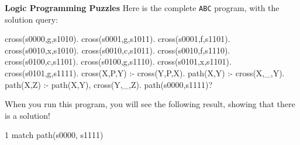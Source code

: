 \begin{minipage}[t]{\sw}
\slidenumber
\LARGE
{\bf Logic Programming Puzzles}\exx
Here is the complete \verb'ABC' program, with the solution query:
\begin{qv}
cross(s0000,g,s1010).
cross(s0001,g,s1011).
cross(s0001,f,s1101).
cross(s0010,x,s1010). %
cross(s0010,c,s1011).
cross(s0010,f,s1110).
cross(s0100,c,s1101).
cross(s0100,g,s1110).
cross(s0101,x,s1101). %
cross(s0101,g,s1111).
cross(X,P,Y) :- cross(Y,P,X).
path(X,Y) :- cross(X,_,Y).
path(X,Z) :- path(X,Y), cross(Y,_,Z).
path(s0000,s1111)?
\end{qv}
When you run this program,
you will see the following result, showing that there is a solution!
\begin{qv}
1 match
path(s0000, s1111)
\end{qv}
\end{minipage}
